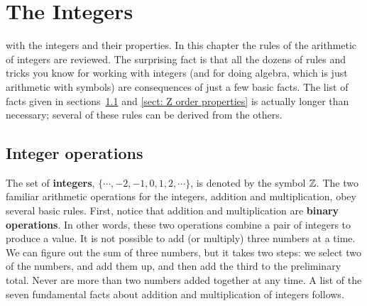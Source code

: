 \chapter{The Integers}

 with the integers and their properties. 
In this chapter  the rules of the arithmetic of integers are reviewed. The 
surprising fact is that all the dozens of rules and tricks you know for working 
with integers (and for doing algebra, which is just arithmetic with symbols) 
are consequences of just a few basic facts. The list of facts given in sections~\ref{sect:integer operations} and \ref{sect: Z order properties}
is actually longer than necessary; several of these rules can be derived
from the others. 


\section{Integer operations}\label{sect:integer operations}
The set of  {\bfseries integers}, $\{ \cdots ,  -2,-1,0,1,2,\cdots\}$,  is denoted by 
the symbol $\mathbb{Z}$.
The two familiar arithmetic operations for the integers, addition and
multiplication, obey  several basic rules. First, notice that addition and
multiplication are {\bfseries binary operations}. In other words, these two
operations combine a pair of integers to produce a value. It is not possible to add
(or multiply) three numbers at a time. We can figure out the sum of three numbers,
but it takes two steps: we select two of the numbers, and add them up, and then
add the third to the preliminary total. Never are more than two numbers added
together at any time. A list of the seven fundamental facts about
addition and multiplication of integers follows.

